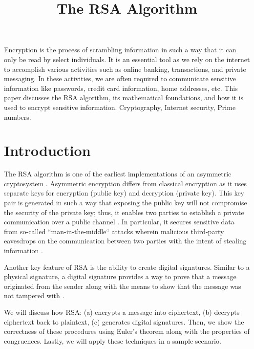 \documentclass[10pt]{article}
\begin{document}
\noindent



\title{The RSA Algorithm}


\maketitle


\abstract
Encryption is the process of scrambling information in such a way that it can only be read by select individuals. It is an essential tool as we rely on the internet to accomplish various activities such as online banking, transactions, and private messaging. In these activities, we are often required to communicate sensitive information like passwords, credit card information, home addresses, etc. This paper discusses the RSA algorithm, its mathematical foundations, and how it is used to encrypt sensitive information.
\keywords
Cryptography, Internet security, Prime numbers.


\section{Introduction}
The RSA algorithm is one of the earliest implementations of an asymmetric cryptosystem \cite{rivest1978method}. Asymmetric encryption differs from classical encryption as it uses separate keys for encryption (public key) and decryption (private key). This key pair is generated in such a way that exposing the public key will not compromise the security of the private key; thus, it enables two parties to establish a private communication over a public channel \cite{diffie1976new}. In particular, it secures sensitive data from so-called “man-in-the-middle“ attacks wherein malicious third-party eavesdrops on the communication between two parties with the intent of stealing information \cite{stallings1999cryptography}.

Another key feature of RSA is the ability to create digital signatures. Similar to a physical signature, a digital signature provides a way to prove that a message originated from the sender along with the means to show that the message was not tampered with \cite{diffie1976new}. 

We will discuss how RSA: (a) encrypts a message into ciphertext, (b) decrypts ciphertext back to plaintext, (c) generates digital signatures. Then, we show the correctness of these procedures using Euler’s theorem along with the properties of congruences. Lastly, we will apply these techniques in a sample scenario.
\end{document}
